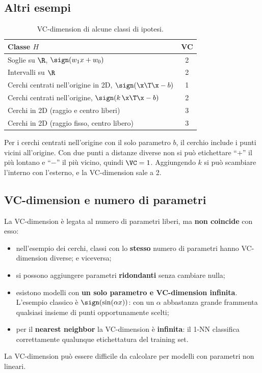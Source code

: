 \subsection{Altri esempi}

\begin{table}[ht]
\centering\small
\caption{VC-dimension di alcune classi di ipotesi.}
\begin{tabular}{lc}
\toprule
Classe $H$ & VC \\
\midrule
Soglie su $\R$, $\sign(w_1x+w_0)$ & 2 \\
Intervalli su $\R$ & 2 \\
Cerchi centrati nell'origine in 2D, $\sign(\x\T\x - b)$ & 1 \\
Cerchi centrati nell'origine, $\sign(k\,\x\T\x - b)$ & 2 \\
Cerchi in 2D (raggio e centro liberi) & 3 \\
Cerchi in 2D (raggio fisso, centro libero) & 3 \\
\bottomrule
\end{tabular}
\end{table}

Per i cerchi centrati nell'origine con il solo parametro $b$, il cerchio include i punti vicini all'origine. Con
due punti a distanze diverse non si può etichettare ``$+$'' il più lontano e ``$-$'' il più vicino, quindi
$\VC=1$. Aggiungendo $k$ si può scambiare l'interno con l'esterno, e la VC-dimension sale a 2.

\subsection{VC-dimension e numero di parametri}

La VC-dimension è legata al numero di parametri liberi, ma \textbf{non coincide} con esso:
\begin{itemize}
  \item nell'esempio dei cerchi, classi con lo \textbf{stesso} numero di parametri hanno VC-dimension diverse; e
        viceversa;
  \item si possono aggiungere parametri \textbf{ridondanti} senza cambiare nulla;
  \item esistono modelli con \textbf{un solo parametro e VC-dimension infinita}. L'esempio classico è
        $\sign(\sin(\alpha x))$: con un $\alpha$ abbastanza grande frammenta qualsiasi insieme di punti
        opportunamente scelti;
  \item per il \textbf{nearest neighbor} la VC-dimension è \textbf{infinita}: il 1-NN classifica correttamente
        qualunque etichettatura del training set.
\end{itemize}
La VC-dimension può essere difficile da calcolare per modelli con parametri non lineari.

